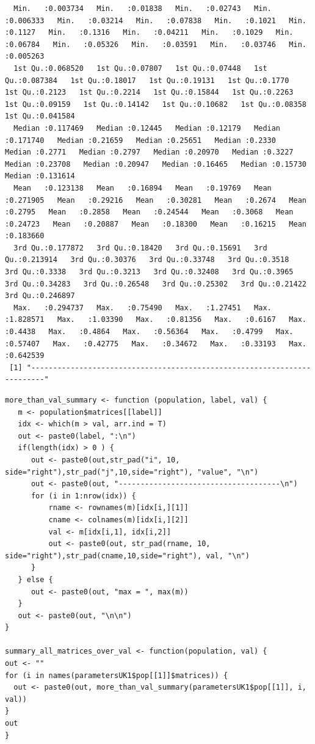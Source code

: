 \documentclass[11pt]{article}
\begin{document}
\begin{itemize}
\begin{verbatim}
  Min.   :0.003734   Min.   :0.01838   Min.   :0.02743   Min.   :0.006333   Min.   :0.03214   Min.   :0.07838   Min.   :0.1021   Min.   :0.1127   Min.   :0.1316   Min.   :0.04211   Min.   :0.1029   Min.   :0.06784   Min.   :0.05326   Min.   :0.03591   Min.   :0.03746   Min.   :0.005263  
  1st Qu.:0.068520   1st Qu.:0.07807   1st Qu.:0.07448   1st Qu.:0.087384   1st Qu.:0.18017   1st Qu.:0.19131   1st Qu.:0.1770   1st Qu.:0.2123   1st Qu.:0.2214   1st Qu.:0.15844   1st Qu.:0.2263   1st Qu.:0.09159   1st Qu.:0.14142   1st Qu.:0.10682   1st Qu.:0.08358   1st Qu.:0.041584  
  Median :0.117469   Median :0.12445   Median :0.12179   Median :0.171740   Median :0.21659   Median :0.25651   Median :0.2330   Median :0.2771   Median :0.2797   Median :0.20970   Median :0.3227   Median :0.23708   Median :0.20947   Median :0.16465   Median :0.15730   Median :0.131614  
  Mean   :0.123138   Mean   :0.16894   Mean   :0.19769   Mean   :0.271905   Mean   :0.29216   Mean   :0.30281   Mean   :0.2674   Mean   :0.2795   Mean   :0.2858   Mean   :0.24544   Mean   :0.3068   Mean   :0.24723   Mean   :0.20887   Mean   :0.18300   Mean   :0.16215   Mean   :0.183660  
  3rd Qu.:0.177872   3rd Qu.:0.18420   3rd Qu.:0.15691   3rd Qu.:0.213914   3rd Qu.:0.30376   3rd Qu.:0.33748   3rd Qu.:0.3518   3rd Qu.:0.3338   3rd Qu.:0.3213   3rd Qu.:0.32408   3rd Qu.:0.3965   3rd Qu.:0.34283   3rd Qu.:0.26548   3rd Qu.:0.25302   3rd Qu.:0.21422   3rd Qu.:0.246897  
  Max.   :0.294737   Max.   :0.75490   Max.   :1.27451   Max.   :1.828571   Max.   :1.03390   Max.   :0.81356   Max.   :0.6167   Max.   :0.4438   Max.   :0.4864   Max.   :0.56364   Max.   :0.4799   Max.   :0.57407   Max.   :0.42775   Max.   :0.34672   Max.   :0.33193   Max.   :0.642539  
 [1] "-------------------------------------------------------------------------"
\end{verbatim}
\end{itemize}

\begin{verbatim}
more_than_val_summary <- function (population, label, val) {
   m <- population$matrices[[label]]
   idx <- which(m > val, arr.ind = T)
   out <- paste0(label, ":\n")
   if(length(idx) > 0 ) {
      out <- paste0(out,str_pad("i", 10, side="right"),str_pad("j",10,side="right"), "value", "\n")
      out <- paste0(out, "-------------------------------------\n")
      for (i in 1:nrow(idx)) {
          rname <- rownames(m)[idx[i,][1]]
          cname <- colnames(m)[idx[i,][2]]
          val <- m[idx[i,1], idx[i,2]]
          out <- paste0(out, str_pad(rname, 10, side="right"),str_pad(cname,10,side="right"), val, "\n")
      }
   } else {
      out <- paste0(out, "max = ", max(m))
   }
   out <- paste0(out, "\n\n")
}

summary_all_matrices_over_val <- function(population, val) {
out <- ""
for (i in names(parametersUK1$pop[[1]]$matrices)) {
  out <- paste0(out, more_than_val_summary(parametersUK1$pop[[1]], i, val))
}
out
}
\end{verbatim}
\end{document}
